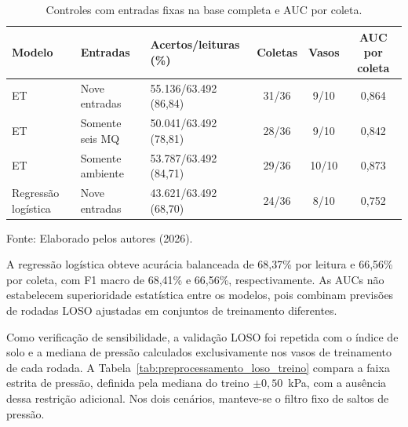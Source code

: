 \begin{table}[H]
    \centering
    \footnotesize
    \caption{Controles com entradas fixas na base completa e AUC por coleta.}
    \label{tab:controles_loso_auc}
    \begin{tabular}{p{}p{}p{}ccc}
        \hline
        Modelo & Entradas & Acertos/leituras (\%) & Coletas & Vasos & AUC por coleta \\
        \hline
        ET & Nove entradas & 55.136/63.492 (86,84) & 31/36 & 9/10 & 0,864 \\
        ET & Somente seis MQ & 50.041/63.492 (78,81) & 28/36 & 9/10 & 0,842 \\
        ET & Somente ambiente & 53.787/63.492 (84,71) & 29/36 & 10/10 & 0,873 \\
        Regressão logística & Nove entradas & 43.621/63.492 (68,70) & 24/36 & 8/10 & 0,752 \\
        \hline
    \end{tabular}

    \vspace{0.1cm}
    {\footnotesize Fonte: Elaborado pelos autores (2026).}
\end{table}

A regressão logística obteve acurácia balanceada de 68,37\% por leitura
e 66,56\% por coleta, com F1 macro de 68,41\% e 66,56\%, respectivamente.
As AUCs não estabelecem superioridade estatística
entre os modelos, pois combinam previsões de rodadas LOSO ajustadas em
conjuntos de treinamento diferentes.

Como verificação de sensibilidade, a validação LOSO foi repetida com o
índice de solo e a mediana de pressão calculados exclusivamente nos vasos
de treinamento de cada rodada. A Tabela~\ref{tab:preprocessamento_loso_treino}
compara a faixa estrita de pressão, definida pela mediana do treino
$\pm 0{,}50$~kPa, com a ausência dessa restrição adicional. Nos dois
cenários, manteve-se o filtro fixo de saltos de pressão.

